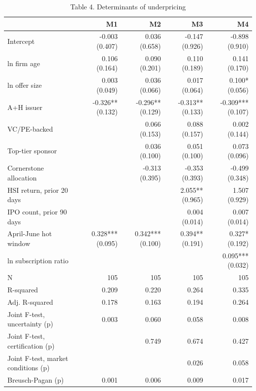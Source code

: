 \begin{table}[htbp]\centering\small
\caption{Table 4. Determinants of underpricing}
\begin{tabular}{lrrrr}
\hline
 & M1 & M2 & M3 & M4 \\
\hline
Intercept & -0.003 (0.407) & 0.036 (0.658) & -0.147 (0.926) & -0.898 (0.910) \\
ln firm age & 0.106 (0.164) & 0.090 (0.201) & 0.110 (0.189) & 0.141 (0.170) \\
ln offer size & 0.003 (0.049) & 0.036 (0.066) & 0.017 (0.064) & 0.100* (0.056) \\
A+H issuer & -0.326** (0.132) & -0.296** (0.129) & -0.313** (0.133) & -0.309*** (0.107) \\
VC/PE-backed &  & 0.066 (0.153) & 0.088 (0.157) & 0.002 (0.144) \\
Top-tier sponsor &  & 0.036 (0.100) & 0.051 (0.100) & 0.073 (0.096) \\
Cornerstone allocation &  & -0.313 (0.395) & -0.353 (0.393) & -0.499 (0.348) \\
HSI return, prior 20 days &  &  & 2.055** (0.965) & 1.507 (0.929) \\
IPO count, prior 90 days &  &  & 0.004 (0.014) & 0.007 (0.014) \\
April-June hot window & 0.328*** (0.095) & 0.342*** (0.100) & 0.394** (0.191) & 0.327* (0.192) \\
ln subscription ratio &  &  &  & 0.095*** (0.032) \\
N & 105 & 105 & 105 & 105 \\
R-squared & 0.209 & 0.220 & 0.264 & 0.335 \\
Adj. R-squared & 0.178 & 0.163 & 0.194 & 0.264 \\
Joint F-test, uncertainty (p) & 0.003 & 0.060 & 0.058 & 0.008 \\
Joint F-test, certification (p) &  & 0.749 & 0.674 & 0.427 \\
Joint F-test, market conditions (p) &  &  & 0.026 & 0.058 \\
Breusch-Pagan (p) & 0.001 & 0.006 & 0.009 & 0.017 \\
\hline
\end{tabular}
\end{table}
